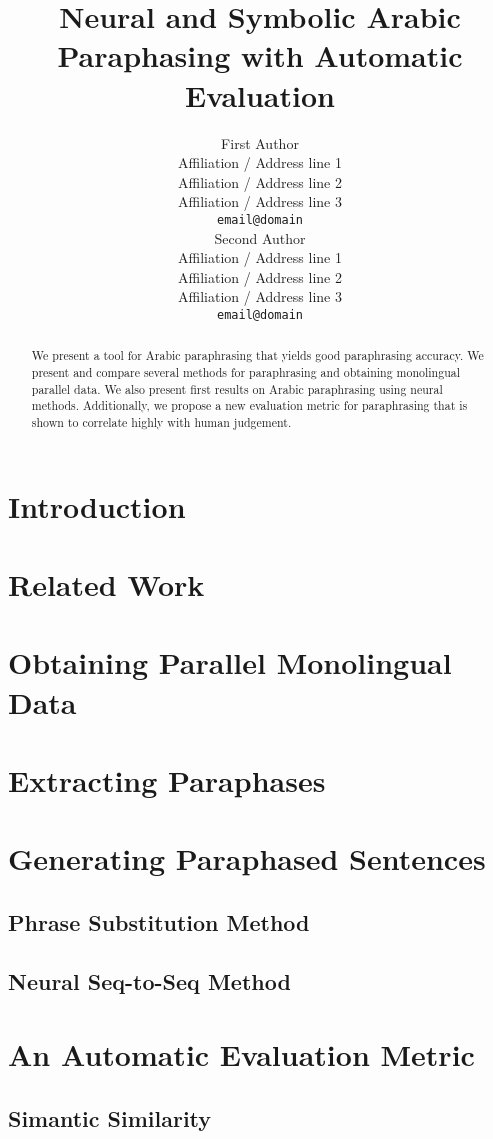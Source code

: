 \documentclass[11pt,letterpaper]{article}
\title{Neural and Symbolic Arabic Paraphasing with Automatic Evaluation}
\author{First Author \\
  Affiliation / Address line 1 \\
  Affiliation / Address line 2 \\
  Affiliation / Address line 3 \\
  {\tt email@domain} \\\And
  Second Author \\
  Affiliation / Address line 1 \\
  Affiliation / Address line 2 \\
  Affiliation / Address line 3 \\
  {\tt email@domain} \\}
\date{}
\begin{document}
\maketitle
\begin{abstract}
We present a tool for Arabic paraphrasing that yields good paraphrasing accuracy.  We present and compare several methods for paraphrasing and obtaining monolingual parallel data. We also present first results on Arabic paraphrasing using neural methods. Additionally, we propose a new evaluation metric for paraphrasing that is shown to correlate highly with human judgement.
\end{abstract}


\section{Introduction}

\section{Related Work}

\section{Obtaining Parallel Monolingual Data}

\section{Extracting Paraphases}

\section{Generating Paraphased Sentences}
\subsection{Phrase Substitution Method}
\subsection{Neural Seq-to-Seq Method}

\section{An Automatic Evaluation Metric}
\subsection{Simantic Similarity}
\end{document}
